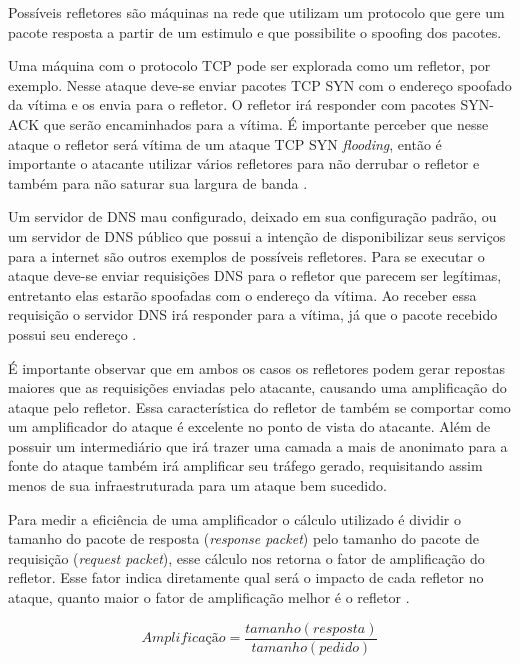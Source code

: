 Possíveis refletores são máquinas na rede que utilizam um protocolo que gere um pacote resposta a partir de um estimulo e que possibilite o spoofing dos pacotes.

Uma máquina com o protocolo TCP pode ser explorada como um refletor, por exemplo. Nesse ataque deve-se enviar pacotes TCP SYN com o endereço spoofado da vítima e os envia para o refletor. O refletor irá responder com pacotes SYN-ACK que serão encaminhados para a vítima. É importante perceber que nesse ataque o refletor será vítima de um ataque TCP SYN \textit{flooding}, então é importante o atacante utilizar vários refletores para não derrubar o refletor e também para não saturar sua largura de banda \cite{Radhakrishnan2011}. 

Um servidor de \acrfull{DNS} mau configurado, deixado em sua configuração padrão, ou um servidor de \acrfull{DNS} público que possui a intenção de disponibilizar seus serviços para a internet são outros exemplos de possíveis refletores. Para se executar o ataque deve-se enviar requisições DNS para o refletor que parecem ser legítimas, entretanto elas estarão spoofadas com o endereço da vítima. Ao receber essa requisição o servidor DNS irá responder para a vítima, já que o pacote recebido possui seu endereço \cite{Anagnostopoulos2013}.

É importante observar que em ambos os casos os refletores podem gerar repostas maiores que as requisições enviadas pelo atacante, causando uma amplificação do ataque pelo refletor. Essa característica do refletor de também se comportar como um amplificador do ataque é excelente no ponto de vista do atacante. Além de possuir um intermediário que irá trazer uma camada a mais de anonimato para a fonte do ataque também irá amplificar seu tráfego gerado, requisitando assim menos de sua infraestruturada para um ataque bem sucedido.

Para medir a eficiência de uma amplificador o cálculo utilizado é dividir o tamanho do pacote de resposta (\textit{response packet}) pelo tamanho do pacote de requisição (\textit{request packet}), esse cálculo nos retorna o fator de amplificação do refletor. Esse fator indica diretamente qual será o impacto de cada refletor no ataque, quanto maior o fator de amplificação melhor é o refletor \cite{Anagnostopoulos2013}.

\begin{equation}
Amplificação = \frac{tamanho(resposta)}{tamanho(pedido)}
\label{cal:Fator_Amp}
\end{equation}


